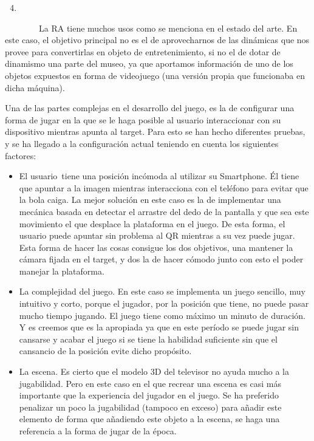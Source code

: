 \documentclass[]{article}
\begin{document}
\begin{enumerate}
\setcounter{enumi}{3}
\item
\end{enumerate}

~~~~~~~~La RA tiene muchos usos como se menciona en el estado del arte.
En este caso, el objetivo principal no es el de aprovecharnos de las
dinámicas que nos provee para convertirlas en objeto de entretenimiento,
si no el de dotar de dinamismo una parte del museo, ya que aportamos
información de uno de los objetos expuestos en forma de videojuego (una
versión propia que funcionaba en dicha máquina).

Una de las partes complejas en el desarrollo del juego, es la de
configurar una forma de jugar en la que se le haga posible al usuario
interaccionar con su dispositivo mientras apunta al target. Para esto se
han hecho diferentes pruebas, y se ha llegado a la configuración actual
teniendo en cuenta los siguientes factores:

\begin{itemize}
\itemsep1pt\parskip0pt
\item
  El usuario~tiene una posición incómoda al utilizar su Smartphone. Él
  tiene que apuntar a la imagen mientras interacciona con el teléfono
  para evitar que la bola caiga. La mejor solución en este caso es la de
  implementar una mecánica basada en detectar el arrastre del dedo de la
  pantalla y que sea este movimiento el que desplace la plataforma en el
  juego. De esta forma, el usuario puede apuntar sin problema al QR
  mientras a su vez puede jugar. Esta forma de hacer las cosas consigue
  los dos objetivos, una mantener la cámara fijada en el target, y dos
  la de hacer cómodo junto con esto el poder manejar la plataforma.
\item
  La complejidad del juego. En este caso se implementa un juego
  sencillo, muy intuitivo y corto, porque el jugador, por la posición
  que tiene, no puede pasar mucho tiempo jugando. El juego tiene como
  máximo un minuto de duración. Y es creemos que es la apropiada ya que
  en este período se puede jugar sin cansarse y acabar el juego si se
  tiene la habilidad suficiente sin que el cansancio de la posición
  evite dicho propósito.
\item
  La escena. Es cierto que el modelo 3D del televisor no ayuda mucho a
  la jugabilidad. Pero en este caso en el que recrear una escena es casi
  más importante que la experiencia del jugador en el juego. Se ha
  preferido penalizar un poco la jugabilidad (tampoco en exceso) para
  añadir este elemento de forma que añadiendo este objeto a la escena,
  se haga una referencia a la forma de jugar de la época.
\end{itemize}
\end{document}
